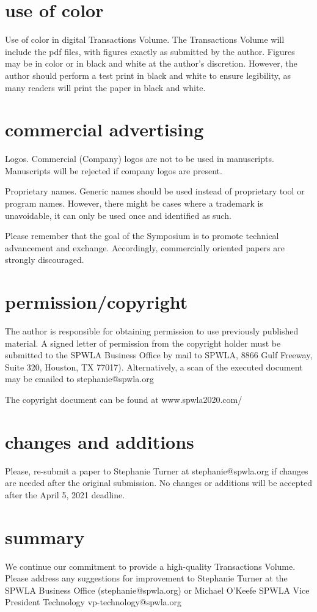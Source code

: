 \documentclass[10pt,twocolumn,twoside]{article}
\begin{document}
\section{use of color}
Use of color in digital Transactions Volume. The Transactions Volume will include the pdf files, with figures exactly as submitted by the author. Figures may be in color or in black and white at the author’s discretion. However, the author should perform a test print in black and white to ensure legibility, as many readers will print the paper in black and white. 

\section{commercial advertising}
Logos. Commercial (Company) logos are not to be used in manuscripts.  Manuscripts will be rejected if company logos are present. 

Proprietary names. Generic names should be used instead of proprietary tool or program names. However, there might be cases where a trademark is unavoidable, it can only be used once and identified as such.

Please remember that the goal of the Symposium is to promote technical advancement and exchange. Accordingly, commercially oriented papers are strongly discouraged.

\section{permission/copyright}
The author is responsible for obtaining permission to use previously published material. A signed letter of permission from the copyright holder must be submitted to the SPWLA Business Office by mail to SPWLA, 8866 Gulf Freeway, Suite 320, Houston, TX 77017). Alternatively, a scan of the executed document may be emailed to stephanie@spwla.org 

The copyright document can be found at www.spwla2020.com/ 

\section{changes and additions}
Please, re-submit a paper to Stephanie Turner at stephanie@spwla.org if changes are needed after the original submission. No changes or additions will be accepted after the April 5, 2021 deadline.

\section{summary}
We continue our commitment to provide a high-quality Transactions Volume. Please address any suggestions for improvement to Stephanie Turner at the SPWLA Business Office (stephanie@spwla.org) or Michael O’Keefe SPWLA Vice President Technology 
vp-technology@spwla.org
\end{document}
